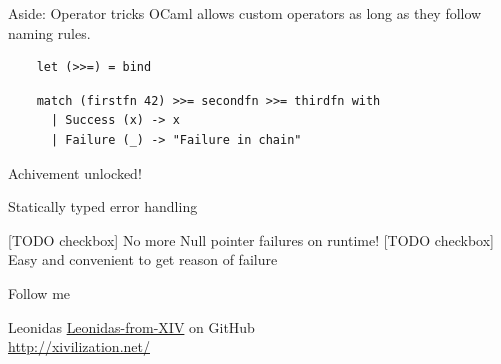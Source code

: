 \documentclass{beamer}
\begin{document}
\begin{frame}[fragile]{Aside: Operator tricks}
  OCaml allows custom operators as long as they follow naming rules.

  \begin{verbatim}
    let (>>=) = bind
  \end{verbatim}

  \begin{verbatim}
    match (firstfn 42) >>= secondfn >>= thirdfn with
      | Success (x) -> x
      | Failure (_) -> "Failure in chain"
  \end{verbatim}
\end{frame}

\begin{frame}{Achivement unlocked!}
  \begin{center}
    {\Huge Statically typed error handling}
  \end{center}
  [TODO checkbox] No more Null pointer failures on runtime!
  [TODO checkbox] Easy and convenient to get reason of failure
\end{frame}

\begin{frame}{Follow me}
  \begin{block}{Leonidas}
    \href{https://github.com/Leonidas-from-XIV}{Leonidas-from-XIV} on GitHub\\
    \url{http://xivilization.net/}
  \end{block}
\end{frame}
\end{document}
